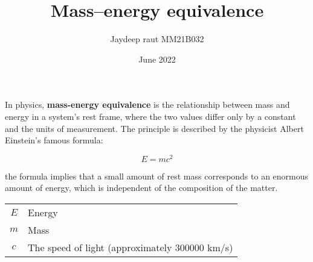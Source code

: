 \documentclass{article}
\title{\textbf{Mass–energy equivalence}}
\date{June 2022}
\author{Jaydeep raut MM21B032}
\begin{document}
  \maketitle
\large
\paragraph{}In physics, \textbf{mass-energy equivalence} is the relationship between mass and energy in a system's rest frame, where the two values differ only by a constant and the units of measurement. The principle is described by the physicist Albert Einstein's famous formula: 

\vspace{1cm}


\boldmath
\begin{equation}
  E=mc^{2}
\end{equation}

\vspace{1cm}

the formula implies that a small amount of rest mass corresponds to an enormous amount of energy, which is independent of the composition of the matter. 

\vspace{1cm}

\begin{tabular}{|c|l|}
    \hline
    $E$ & Energy \\
    $m$ & Mass\\
    $c$ & The speed of light (approximately 300000 km/s)  \\
    \hline
\end{tabular}
\end{document}
